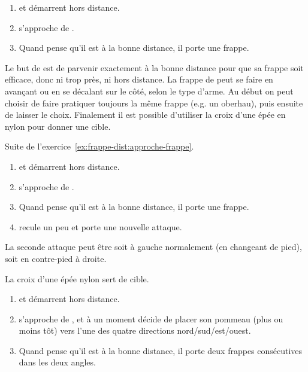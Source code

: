 \begin{exercice}
\label{ex:frappe-dist:approche-frappe}

\begin{enumerate}
	\item \A et \D démarrent hors distance.
	\item \D s'approche de \A.
	\item Quand \A pense qu'il est à la bonne distance, il porte une frappe.
\end{enumerate}

Le but de \A est de parvenir exactement à la bonne distance pour que sa frappe soit efficace, donc ni trop près, ni hors distance.
La frappe de \A peut se faire en avançant ou en se décalant sur le côté, selon le type d'arme.
Au début on peut choisir de faire pratiquer toujours la même frappe (e.g.
un oberhau), puis ensuite de laisser le choix.
Finalement il est possible d'utiliser la croix d'une épée en nylon pour donner une cible.
\end{exercice}


\begin{exercice}
\label{ex:frappe-dist:approche-double-frappe}

Suite de l'exercice~\ref{ex:frappe-dist:approche-frappe}.

\begin{enumerate}
	\item \A et \D démarrent hors distance.
	\item \D s'approche de \A.
	\item Quand \A pense qu'il est à la bonne distance, il porte une frappe.
	\item \D recule un peu et \A porte une nouvelle attaque.
\end{enumerate}

La seconde attaque peut être soit à gauche normalement (en changeant de pied), soit en contre-pied à droite.
\end{exercice}


\begin{exercice}
\label{ex:frappe-dist:approche-croix-aleat}

La croix d'une épée nylon sert de cible.

\begin{enumerate}
	\item \A et \D démarrent hors distance.
	\item \D s'approche de \A, et à un moment décide de placer son pommeau (plus ou moins tôt) vers l'une des quatre directions nord/sud/est/ouest.
	\item Quand \A pense qu'il est à la bonne distance, il porte deux frappes consécutives dans les deux angles.
\end{enumerate}

\end{exercice}



